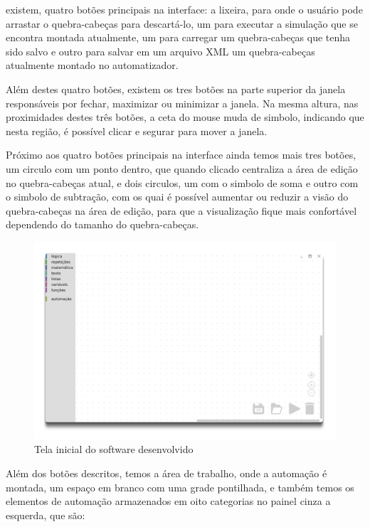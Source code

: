 \documentclass[tg]{mdtufsm}
\begin{document}
                existem, quatro botões principais na interface: a lixeira, para onde o usuário pode arrastar o quebra-cabeças para descartá-lo, um para executar a simulação que se encontra montada atualmente, um para carregar um quebra-cabeças que tenha sido salvo e outro para salvar em um arquivo XML um quebra-cabeças atualmente montado no automatizador.

                Além destes quatro botões, existem os tres botões na parte superior da janela responsáveis por fechar, maximizar ou minimizar a janela. Na mesma altura, nas proximidades destes três botões, a ceta do mouse muda de simbolo, indicando que nesta região, é possível clicar e segurar para mover a janela.

                Próximo aos quatro botões principais na interface ainda temos mais tres botões, um circulo com um ponto dentro, que quando clicado centraliza a área de edição no quebra-cabeças atual, e dois circulos, um com o simbolo de soma e outro com o simbolo de subtração, com os quai é possível aumentar ou reduzir a visão do quebra-cabeças na área de edição, para que a visualização fique mais confortável dependendo do tamanho do quebra-cabeças.

                \begin{figure}[!htb]
                    {\centering
                    \includegraphics[width=1.0\textwidth]{imagens/app.png}
                    \caption{Tela inicial do software desenvolvido}
                    \label{fig:app}}
                \end{figure}

                Além dos botões descritos, temos a área de trabalho, onde a automação é montada, um espaço em branco com uma grade pontilhada, e também temos os elementos de automação armazenados em oito categorias no painel cinza a esquerda, que são:
\end{document}
